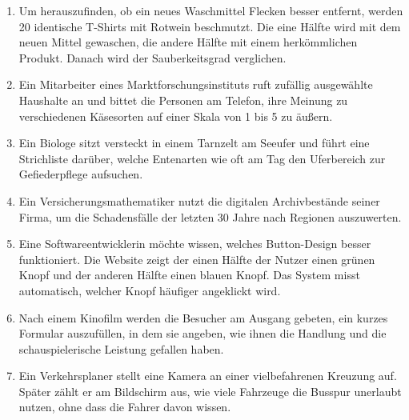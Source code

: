 \begin{enumerate}
\item
Um herauszufinden, ob ein neues Waschmittel Flecken besser entfernt, werden 20 identische T-Shirts mit Rotwein beschmutzt.
    Die eine Hälfte wird mit dem neuen Mittel gewaschen, die andere Hälfte mit einem herkömmlichen Produkt.
    Danach wird der Sauberkeitsgrad verglichen. 

\item
Ein Mitarbeiter eines Marktforschungsinstituts ruft zufällig ausgewählte Haushalte an und bittet die Personen am Telefon,
    ihre Meinung zu verschiedenen Käsesorten auf einer Skala von 1 bis 5 zu äußern. 

\item
Ein Biologe sitzt versteckt in einem Tarnzelt am Seeufer und führt eine Strichliste darüber, welche Entenarten wie oft am
    Tag den Uferbereich zur Gefiederpflege aufsuchen. 

\item
Ein Versicherungsmathematiker nutzt die digitalen Archivbestände seiner Firma, um die Schadensfälle der letzten
    30 Jahre nach Regionen auszuwerten. 

\item
Eine Softwareentwicklerin möchte wissen, welches Button-Design besser funktioniert. Die Website zeigt der einen Hälfte
    der Nutzer einen grünen Knopf und der anderen Hälfte einen blauen Knopf. Das System misst automatisch, welcher
    Knopf häufiger angeklickt wird. 

\item
Nach einem Kinofilm werden die Besucher am Ausgang gebeten, ein kurzes Formular auszufüllen, in dem sie angeben,
    wie ihnen die Handlung und die schauspielerische Leistung gefallen haben. 

\item
Ein Verkehrsplaner stellt eine Kamera an einer vielbefahrenen Kreuzung auf. Später zählt er am Bildschirm aus,
    wie viele Fahrzeuge die Busspur unerlaubt nutzen, ohne dass die Fahrer davon wissen. 


\end{enumerate}
